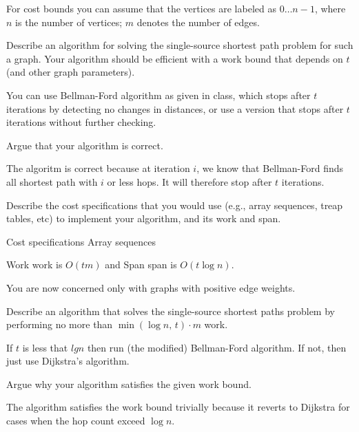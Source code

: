 For cost bounds you can assume that the vertices are labeled as $0
\ldots n-1$, where $n$ is the number of vertices; $m$ denotes the
number of edges.

\begin{problem}[6.]

\ask
Describe an algorithm for solving the single-source shortest %
path problem for such a graph.  Your algorithm should be efficient
with a work bound that depends on $t$ (and other graph parameters).

\sol
You can use Bellman-Ford algorithm as given in class, which stops
after $t$ iterations by detecting no changes in distances, or use a
version that stops after $t$ iterations without further checking.

\ask
Argue that your algorithm is correct.

\sol
  The algoritm is correct because at iteration $i$, we know that
  Bellman-Ford finds all shortest path with $i$ or less hops.  It will
  therefore stop after $t$ iterations.
\end{problem}


\begin{problem}[2.]

Describe the cost specifications that you would use (e.g., array sequences, treap tables, etc) to implement your algorithm,
and its work and  span.

\ask Cost specifications
\sol Array sequences~~~~~~~~~~~

\ask Work 
\sol  work is $O(tm)$ and 
\ask Span 
\sol  span is $O(t\log{n})$.
\end{problem}


\begin{problem}[4.]

You are now concerned only with graphs with positive edge
weights. 

\ask[2.]
Describe an algorithm that solves the single-source shortest
paths problem by performing no more than $\min ( \log{n}, \, {t} )
\cdot {m}$ work.  \vspace{1in}

\sol
  If $t$ is less that $lg n$ then run (the modified) Bellman-Ford
  algorithm.  If not, then just use Dijkstra's algorithm.


\ask[2.]
Argue why your algorithm satisfies the given work bound.

\sol
  The algorithm satisfies the work bound trivially because it reverts
  to Dijkstra for cases when the hop count exceed $\log n$.

\end{problem}


